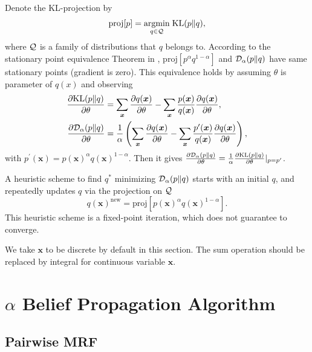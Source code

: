 Denote the KL-projection by
\begin{equation}
  \text{proj}[p] = \underset{q \in \mathcal{Q}}{\operatorname{argmin}}\; \mathrm{KL}(p\|q),
\end{equation}
where $\mathcal{Q}$ is a family of distributions that $q$ belongs to.
According to the stationary point equivalence Theorem in \cite{divergence-measures-and-message-passing}, $\text{proj}[p^{\alpha}q^{1- \alpha}]$ and $\mathcal{D}_{\alpha}(p\|q)$ have same stationary points (gradient is zero). This equivalence holds by assuming $\theta$ is parameter of $q(x)$ and observing
\begin{align}
  \frac{ \partial \mathrm{KL}(p\|q)}{\partial \theta} &= \sum_{\bm{x}} \frac{ \partial q(\bm{x})}{\partial \theta} - \sum_{\bm{x}}\frac{p(\bm{x})}{q(\bm{x})} \frac{ \partial q(\bm{x})}{\partial \theta} , \nonumber \\
  \frac{ \partial \mathrm{\mathcal{D}_{\alpha}}(p\|q)}{\partial \theta} &= \frac{1}{\alpha} \left( \sum_{\bm{x}} \frac{ \partial q(\bm{x})}{\partial \theta} - \sum_{\bm{x}}\frac{p^{\prime}(\bm{x})}{q(\bm{x})} \frac{ \partial q(\bm{x})}{\partial \theta} \right), \nonumber
\end{align}
with $p^{\prime}(\bm{x}) = p(\bm{x})^{\alpha}q(\bm{x})^{1-\alpha}$. Then it gives $\frac{ \partial \mathrm{\mathcal{D}_{\alpha}}(p\|q)}{\partial \theta}  = \frac{1}{\alpha}\frac{ \partial \mathrm{KL}(p\|q)}{\partial \theta}|_{p=p^{\prime}}$.

A heuristic scheme to find $q^{\ast}$ minimizing $\mathcal{D}_{\alpha}(p\|q)$ starts with an initial $q$, and repeatedly updates $q$ via the projection on $\mathcal{Q}$
\begin{equation}\label{eq:fixed-point-iter}
  q(\bm{x})^{\text{new}}  = \text{proj}[p(\bm{x})^{\alpha}q(\bm{x})^{1-\alpha}].
\end{equation}
This heuristic scheme is a fixed-point iteration, which does not guarantee to converge.

\begin{remark}
  We take $\bm{x}$ to be discrete by default in this section. The sum operation should be replaced by integral for continuous variable $\bm{x}$.
\end{remark}

\section{$\alpha$ Belief Propagation Algorithm}\label{sec:alpha-bp-factor-refine}

\subsection{Pairwise MRF}

